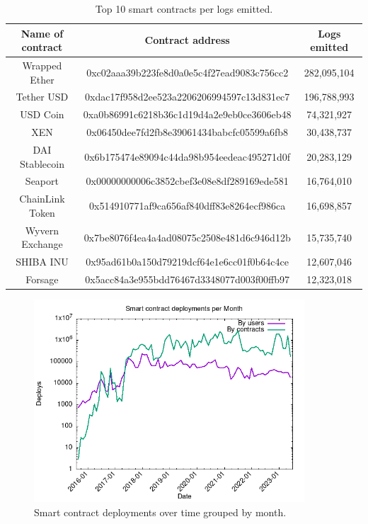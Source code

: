 \begin{table}[H]
\centering
    \begin{threeparttable}
    \begin{tabular}{ c c c } 
    \toprule
    \textbf{Name of contract} & \textbf{Contract address} & \textbf{Logs emitted} \\
    \midrule
       Wrapped Ether & \small{0xc02aaa39b223fe8d0a0e5c4f27ead9083c756cc2} & 282,095,104  \\ [1.2ex]
       Tether USD  & \small{0xdac17f958d2ee523a2206206994597c13d831ec7} & 196,788,993  \\ [1.2ex]
       USD Coin & \small{0xa0b86991c6218b36c1d19d4a2e9eb0ce3606eb48} & 74,321,927  \\ [1.2ex]
       XEN & \small{0x06450dee7fd2fb8e39061434babcfc05599a6fb8} & 30,438,737  \\ [1.2ex]
       DAI Stablecoin& \small{0x6b175474e89094c44da98b954eedeac495271d0f} & 20,283,129  \\ [1.2ex]
       Seaport & \small{0x00000000006c3852cbef3e08e8df289169ede581} & 16,764,010  \\ [1.2ex]
       ChainLink Token & \small{0x514910771af9ca656af840dff83e8264ecf986ca} & 16,698,857  \\ [1.2ex]
       Wyvern Exchange & \small{0x7be8076f4ea4a4ad08075c2508e481d6c946d12b} & 15,735,740  \\ [1.2ex]
       SHIBA INU & \small{0x95ad61b0a150d79219dcf64e1e6cc01f0b64c4ce} & 12,607,046  \\ [1.2ex]
       Forsage & \small{0x5acc84a3e955bdd76467d3348077d003f00ffb97} & 12,323,018  \\ [1.2ex]  
    \bottomrule
    \end{tabular}
    \end{threeparttable}
    \caption{Top 10 smart contracts per logs emitted.}
    \label{table:top-logs-emitters}
\end{table}

\begin{figure}[H]
    \centering
    \includegraphics[width=0.9\textwidth]{Figures/analysis/deploys_per_month.png}
    \caption{Smart contract deployments over time grouped by month.}
    \label{fig:deploy-history}
\end{figure}


